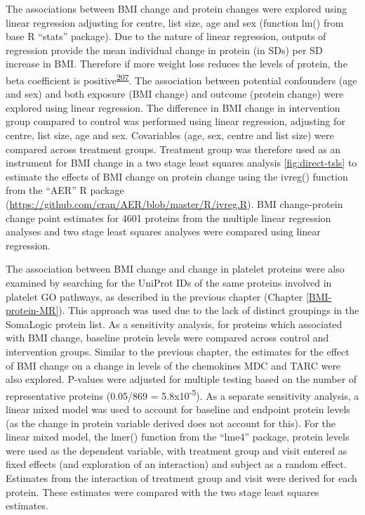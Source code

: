 \documentclass[11pt,twoside]{bristolthesis}
\begin{document}
The associations between BMI change and protein changes were explored using linear regression adjusting for centre, list size, age and sex (function lm() from base R ``stats'' package). Due to the nature of linear regression, outputs of regression provide the mean individual change in protein (in SDs) per SD increase in BMI. Therefore if more weight loss reduces the levels of protein, the beta coefficient is positive\textsuperscript{\protect\hyperlink{ref-Figarska2020}{207}}. The association between potential confounders (age and sex) and both exposure (BMI change) and outcome (protein change) were explored using linear regression. The difference in BMI change in intervention group compared to control was performed using linear regression, adjusting for centre, list size, age and sex. Covariables (age, sex, centre and list size) were compared across treatment groups. Treatment group was therefore used as an instrument for BMI change in a two stage least squares analysis \ref{fig:direct-tsls} to estimate the effects of BMI change on protein change using the ivreg() function from the ``AER'' R package (\url{https://github.com/cran/AER/blob/master/R/ivreg.R}). BMI change-protein change point estimates for 4601 proteins from the multiple linear regression analyses and two stage least squares analyses were compared using linear regression.

The association between BMI change and change in platelet proteins were also examined by searching for the UniProt IDs of the same proteins involved in platelet GO pathways, as described in the previous chapter (Chapter \ref{BMI-protein-MR}). This approach was used due to the lack of distinct groupings in the SomaLogic protein list. As a sensitivity analysis, for proteins which associated with BMI change, baseline protein levels were compared across control and intervention groups. Similar to the previous chapter, the estimates for the effect of BMI change on a change in levels of the chemokines MDC and TARC were also explored. P-values were adjusted for multiple testing based on the number of representative proteins (0.05/869 = 5.8x10\textsuperscript{-5}). As a separate sensitivity analysis, a linear mixed model was used to account for baseline and endpoint protein levels (as the change in protein variable derived does not account for this). For the linear mixed model, the lmer() function from the ``lme4'' package, protein levels were used as the dependent variable, with treatment group and visit entered as fixed effects (and exploration of an interaction) and subject as a random effect. Estimates from the interaction of treatment group and visit were derived for each protein. These estimates were compared with the two stage least squares estimates.
\end{document}
